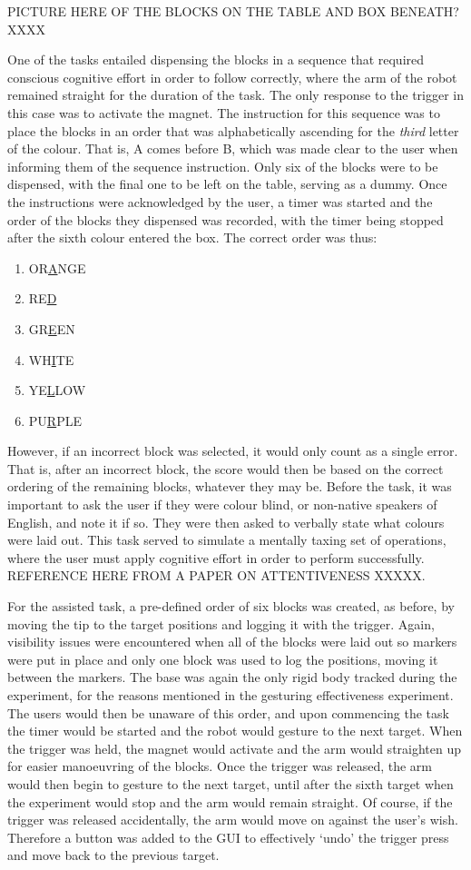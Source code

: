 \documentclass[11pt]{article}
\begin{document}
PICTURE HERE OF THE BLOCKS ON THE TABLE AND BOX BENEATH? XXXX

One of the tasks entailed dispensing the blocks in a sequence that required conscious cognitive effort in order to follow correctly, where the arm of the robot remained straight for the duration of the task. The only response to the trigger in this case was to activate the magnet. The instruction for this sequence was to place the blocks in an order that was alphabetically ascending for the \textit{third} letter of the colour. That is, A comes before B, which was made clear to the user when informing them of the sequence instruction. Only six of the blocks were to be dispensed, with the final one to be left on the table, serving as a dummy. Once the instructions were acknowledged by the user, a timer was started and the order of the blocks they dispensed was recorded, with the timer being stopped after the sixth colour entered the box. The correct order was thus:
\begin{enumerate}
\item{OR\underline{A}NGE}
\item{RE\underline{D}}
\item{GR\underline{E}EN}
\item{WH\underline{I}TE}
\item{YE\underline{L}LOW}
\item{PU\underline{R}PLE}
\end{enumerate}

However, if an incorrect block was selected, it would only count as a single error. That is, after an incorrect block, the score would then be based on the correct ordering of the remaining blocks, whatever they may be. Before the task, it was important to ask the user if they were colour blind, or non-native speakers of English, and note it if so. They were then asked to verbally state what colours were laid out. This task served to simulate a mentally taxing set of operations, where the user must apply cognitive effort in order to perform successfully. REFERENCE HERE FROM A PAPER ON ATTENTIVENESS XXXXX.

For the assisted task, a pre-defined order of six blocks was created, as before, by moving the tip to the target positions and logging it with the trigger. Again, visibility issues were encountered when all of the blocks were laid out so markers were put in place and only one block was used to log the positions, moving it between the markers. The base was again the only rigid body tracked during the experiment, for the reasons mentioned in the gesturing effectiveness experiment. The users would then be unaware of this order, and upon commencing the task the timer would be started and the robot would gesture to the next target. When the trigger was held, the magnet would activate and the arm would straighten up for easier manoeuvring of the blocks. Once the trigger was released, the arm would then begin to gesture to the next target, until after the sixth target when the experiment would stop and the arm would remain straight. Of course, if the trigger was released accidentally, the arm would move on against the user's wish. Therefore a button was added to the GUI to effectively `undo' the trigger press and move back to the previous target. 
\end{document}
